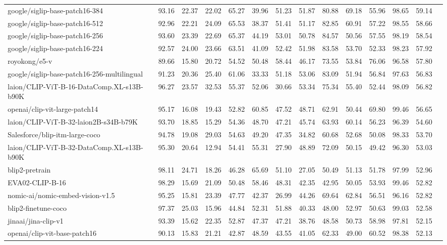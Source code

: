 \begin{table*}
{\begin{tabular}{lccccccccccccc}
google/siglip-base-patch16-384 &93.16 &22.37 &22.02 &65.27 &39.96 &51.23 &51.87 &80.88 &69.18 &55.96 &98.65 &59.14 \\
google/siglip-base-patch16-512 &92.96 &22.21 &24.09 &65.53 &38.37 &51.41 &51.17 &82.85 &60.91 &57.22 &98.55 &58.66 \\
google/siglip-base-patch16-256 &93.60 &23.39 &22.69 &65.37 &44.19 &53.01 &50.78 &84.57 &50.56 &57.55 &98.19 &58.54 \\
google/siglip-base-patch16-224 &92.57 &24.00 &23.66 &63.51 &41.09 &52.42 &51.98 &83.58 &53.70 &52.33 &98.23 &57.92 \\
royokong/e5-v &89.66 &15.80 &20.72 &54.52 &50.48 &58.44 &46.17 &73.55 &53.84 &76.06 &96.58 &57.80 \\
google/siglip-base-patch16-256-multilingual &91.23 &20.36 &25.40 &61.06 &33.33 &51.18 &53.06 &83.09 &51.94 &56.84 &97.63 &56.83 \\
laion/CLIP-ViT-B-16-DataComp.XL-s13B-b90K &96.27 &23.57 &32.53 &55.37 &52.06 &30.66 &53.34 &75.34 &55.40 &52.44 &98.09 &56.82 \\
openai/clip-vit-large-patch14 &95.17 &16.08 &19.43 &52.82 &60.85 &47.52 &48.71 &62.91 &50.44 &69.80 &99.46 &56.65 \\
laion/CLIP-ViT-B-32-laion2B-s34B-b79K &93.70 &18.85 &15.29 &54.36 &48.70 &47.21 &45.74 &63.93 &60.14 &56.23 &96.39 &54.60 \\
Salesforce/blip-itm-large-coco &94.78 &19.08 &29.03 &54.63 &49.20 &47.35 &34.82 &60.68 &52.68 &50.08 &98.33 &53.70 \\
laion/CLIP-ViT-B-32-DataComp.XL-s13B-b90K &95.30 &20.64 &12.94 &54.41 &55.31 &27.90 &48.89 &72.09 &50.15 &49.42 &96.30 &53.03 \\
blip2-pretrain &98.11 &24.71 &18.26 &46.28 &65.69 &51.10 &27.05 &50.49 &51.13 &51.78 &97.99 &52.96 \\
EVA02-CLIP-B-16 &98.29 &15.69 &21.09 &50.48 &58.46 &48.31 &42.35 &42.95 &50.05 &53.93 &99.46 &52.82 \\
nomic-ai/nomic-embed-vision-v1.5 &95.25 &15.81 &23.39 &47.77 &42.37 &26.99 &44.26 &69.64 &62.84 &56.51 &96.16 &52.82 \\
blip2-finetune-coco &97.37 &25.03 &15.96 &44.84 &52.31 &51.88 &40.33 &48.00 &52.97 &50.63 &99.03 &52.58 \\
jinaai/jina-clip-v1 &93.39 &15.62 &22.35 &52.87 &47.37 &47.21 &38.76 &48.58 &50.73 &58.98 &97.81 &52.15 \\
openai/clip-vit-base-patch16 &90.13 &15.83 &21.21 &42.87 &48.59 &43.55 &41.05 &62.33 &49.00 &60.52 &98.38 &52.13 \\

\end{tabular}}
\end{table*}
